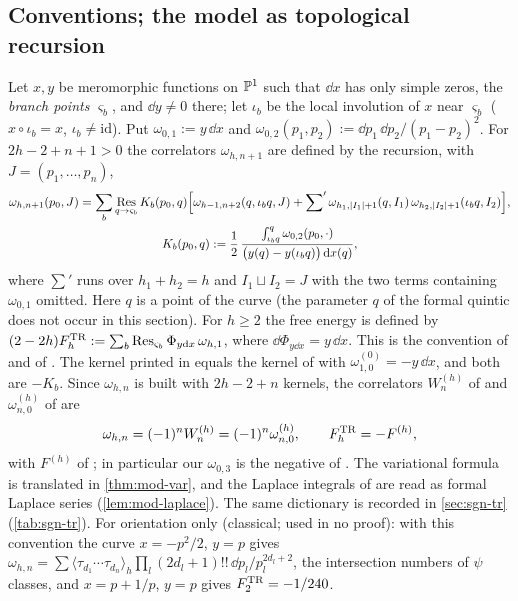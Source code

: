 \subsection{Conventions; the model as topological recursion}
\label{sec:mod-tr}

\begin{conv}
\label{conv:mod-kernel}
Let $x,y$ be meromorphic functions on $\mathbb{P}^1$ such that $\dd x$ has only simple zeros, the \emph{branch points} $\varsigma_b$, and $\dd y\neq 0$ there; let $\iota_b$ be the local involution of $x$ near $\varsigma_b$ ($x\circ\iota_b=x$, $\iota_b\neq\mathrm{id}$). Put $\omega_{0,1}:=y\,\dd x$ and $\omega_{0,2}(p_1,p_2):=\dd p_1\,\dd p_2/(p_1-p_2)^2$. For $2h-2+n+1>0$ the correlators $\omega_{h,n+1}$ are defined by the recursion, with $J=(p_1,\dots,p_n)$,
\begin{equation}
\label{eq:mod-kernel}
\begin{gathered}
\omega_{h,n+1}(p_0,J)=\sum_b\operatorname*{Res}_{q\to\varsigma_b}K_b(p_0,q)\Big[\omega_{h-1,n+2}(q,\iota_bq,J)+{\sum}'\,\omega_{h_1,|I_1|+1}(q,I_1)\,\omega_{h_2,|I_2|+1}(\iota_bq,I_2)\Big],\\
K_b(p_0,q):=\frac{1}{2}\,\frac{\int_{\iota_bq}^{q}\omega_{0,2}(p_0,\cdot)}{\big(y(q)-y(\iota_bq)\big)\,\mathrm{d} x(q)},
\end{gathered}
\end{equation}
where ${\sum}'$ runs over $h_1+h_2=h$ and $I_1\sqcup I_2=J$ with the two terms containing $\omega_{0,1}$ omitted. Here $q$ is a point of the curve (the parameter $q$ of the formal quintic does not occur in this section). For $h\geq 2$ the free energy is defined by $(2-2h)F^{\mathrm{TR}}_h:=\sum_b\operatorname*{Res}_{\varsigma_b}\Phi_{y\mathrm{d} x}\,\omega_{h,1}$, where $\dd\Phi_{y\dd x}=y\,\dd x$. This is the convention of \cite[(2-26)--(2-29)]{Dunin-Barkowski:2015caa} and of \cite[(2.1)]{Hock25}. The kernel printed in \cite[(4-3), (4-9)]{Eynard:2007kz} equals the kernel of \cite[(1.1)]{ABDKS25} with $\omega^{(0)}_{1,0}=-y\,\dd x$, and both are $-K_b$. Since $\omega_{h,n}$ is built with $2h-2+n$ kernels, the correlators $W^{(h)}_n$ of \cite{Eynard:2007kz} and $\omega^{(h)}_{n,0}$ of \cite{ABDKS25} are
\[
\omega_{h,n}=(-1)^nW^{(h)}_n=(-1)^n\omega^{(h)}_{n,0},\qquad F^{\mathrm{TR}}_h=-F^{(h)},
\]
with $F^{(h)}$ of \cite[Def.~4.3 (4-10)]{Eynard:2007kz}; in particular our $\omega_{0,3}$ is the negative of \cite[Thm.~4.1 (4-20)]{Eynard:2007kz}. The variational formula is translated in \cref{thm:mod-var}, and the Laplace integrals of \cite[(2-31), (2-32)]{Dunin-Barkowski:2015caa} are read as formal Laplace series (\cref{lem:mod-laplace}). The same dictionary is recorded in \cref{sec:sgn-tr} (\cref{tab:sgn-tr}). For orientation only (classical; used in no proof): with this convention the curve $x=-p^2/2$, $y=p$ gives $\omega_{h,n}=\sum\langle\tau_{d_1}\cdots\tau_{d_n}\rangle_h\prod_l(2d_l+1)!!\,\dd p_l/p_l^{2d_l+2}$, the intersection numbers of $\psi$ classes, and $x=p+1/p$, $y=p$ gives $F^{\mathrm{TR}}_2=-1/240$.
\end{conv}

